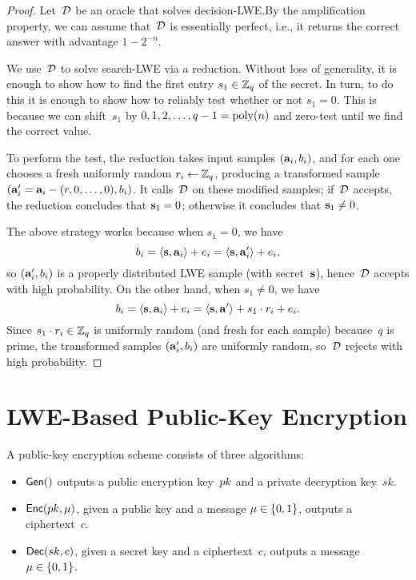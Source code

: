 \documentclass[11pt]{article}
\begin{document}
\begin{proof}
  Let~$\mathcal{D}$ be an oracle that solves decision-LWE.\@ By the
  amplification property, we can assume that~$\mathcal{D}$ is essentially
  perfect, i.e., it returns the correct answer with advantage
  $1 - 2^{-n}$.

  We use~$\mathcal{D}$ to solve search-LWE via a reduction. Without loss of
  generality, it is enough to show how to find the first entry
  $s_1 \in \mathbb{Z}_q$ of the secret. In turn, to do this it is enough to
  show how to reliably test whether or not $s_1 = 0$. This is because
  we can shift~$s_1$ by $0,1,2,\ldots,q-1 = \operatorname{poly}(n)$ and zero-test
  until we find the correct value.

  To perform the test, the reduction takes input samples
  $(\mathbf{a}_{i},b_{i})$, and for each one chooses a fresh uniformly
  random $r_{i} \gets \mathbb{Z}_q$, producing a transformed sample
  $(\mathbf{a}'_{i} = \mathbf{a}_{i} - (r,0,\ldots,0), b_{i})$. It calls~$\mathcal{D}$
  on these modified samples; if~$\mathcal{D}$ accepts, the reduction
  concludes that $\mathbf{s}_1 = 0$; otherwise it concludes that
  $\mathbf{s}_1 \neq 0$.

  The above strategy works because when $s_1 = 0$, we have
  \[ b_{i} = \langle\mathbf{s},\mathbf{a}_{i}\rangle+e_{i} =
    \langle\mathbf{s},\mathbf{a}'_{i}\rangle+e_{i} , \] so $(\mathbf{a}'_{i}, b_{i})$ is a
  properly distributed LWE sample (with secret~$\mathbf{s}$), hence~$\mathcal{D}$
  accepts with high probability. On the other hand, when $s_1 \neq 0$,
  we have
  \[ b_{i} = \langle\mathbf{s},\mathbf{a}_{i}\rangle+e_{i} = \langle\mathbf{s},\mathbf{a}'\rangle +
    s_1 \cdot r_{i} + e_{i} . \] Since $s_1 \cdot r_{i} \in \mathbb{Z}_q$ is
  uniformly random (and fresh for each sample) because~$q$ is prime,
  the transformed samples $(\mathbf{a}'_{i},b_{i})$ are uniformly random,
  so~$\mathcal{D}$ rejects with high probability.
\end{proof}

\section{LWE-Based Public-Key Encryption}
\label{sec:lwe-pke}

A public-key encryption scheme consists of three algorithms:
\begin{itemize}
\item $\mathsf{Gen}()$ outputs a public encryption key~$pk$ and a private
  decryption key~$sk$.
\item $\mathsf{Enc}(pk,\mu)$, given a public key and a message
  $\mu \in \{0,1\}$, outputs a ciphertext~$c$.
\item $\mathsf{Dec}(sk,c)$, given a secret key and a ciphertext~$c$,
  outputs a message $\mu \in \{0,1\}$.
\end{itemize}
\end{document}
